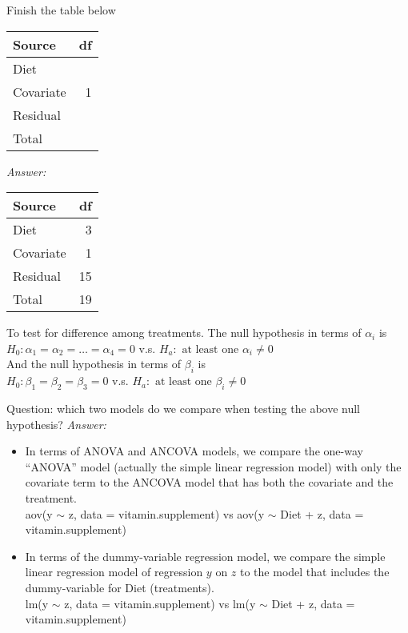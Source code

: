 Finish the table below
\begin{table}[H]
	\renewcommand{\arraystretch}{1.5}
	\centering
	\begin{tabular}{lr}
		\toprule
		Source & df\\
		\hline
		Diet & \\
		Covariate & 1\\
		Residual & \\
		\hline
		Total &\\
		\bottomrule
	\end{tabular}
\end{table}
{\it Answer: }\\
\begin{pf}
\begin{table}[H]
	\renewcommand{\arraystretch}{1.5}
	\centering
	\begin{tabular}{lr}
		\toprule
		Source & df\\
		\hline
		Diet & 3\\
		Covariate & 1\\
		Residual & 15\\
		\hline
		Total & 19\\
		\bottomrule
	\end{tabular}
\end{table}
\end{pf}

To test for difference among treatments.
The null hypothesis in terms of $\alpha_i$ is\\
$H_0: \alpha_1 = \alpha_2  = \dots = \alpha_4 = 0$ v.s. $H_a: \mbox{ at least one } \alpha_i \ne 0$\\
And the null hypothesis in terms of $\beta_i$ is\\
$H_0: \beta_1 = \beta_2  = \beta_3 = 0$ v.s. $H_a: \mbox{ at least one } \beta_i \ne 0$

Question: which two models do we compare when testing the above null hypothesis?
{\it Answer: }\\
\begin{pf}
\begin{itemize}
	\item In terms of ANOVA and ANCOVA models, we compare the one-way ``ANOVA'' model (actually the simple linear regression model) with only the covariate term to the ANCOVA model that has both the covariate and the treatment.\\
	\colorbox{shadecolor}{aov(y $\sim$ z, data = vitamin.supplement)} vs \colorbox{shadecolor}{aov(y $\sim$ Diet + z, data = vitamin.supplement)} 
	\item In terms of the dummy-variable regression model, we compare the simple linear regression model of regression $y$ on $z$ to the model that includes the dummy-variable for Diet (treatments).\\
	\colorbox{shadecolor}{lm(y $\sim$ z, data = vitamin.supplement)} vs \colorbox{shadecolor}{lm(y $\sim$ Diet + z, data = vitamin.supplement)} 
\end{itemize}
\end{pf}


